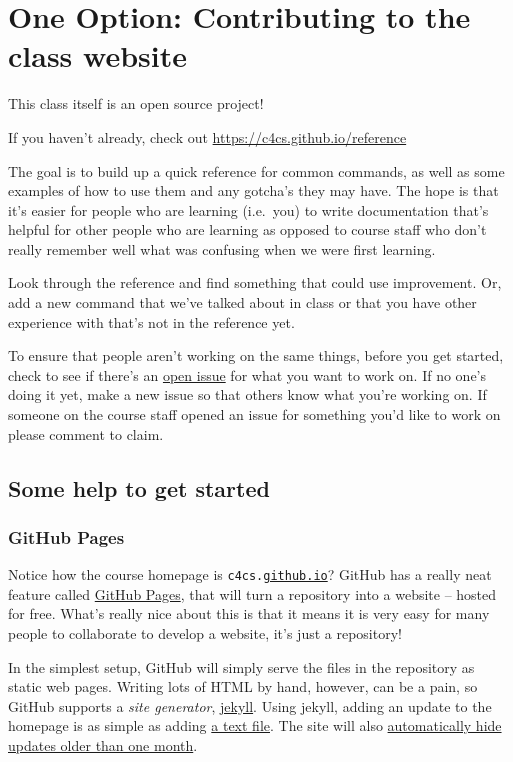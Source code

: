 \documentclass{article}
\begin{document}
\newpage

\section*{One Option: Contributing to the class website}

This class itself is an open source project!

If you haven't already, check out \url{https://c4cs.github.io/reference}

The goal is to build up a quick reference for common commands, as well as some
examples of how to use them and any gotcha's they may have. The hope is that
it's easier for people who are learning (i.e.\ you) to write documentation
that's helpful for other people who are learning as opposed to course staff
who don't really remember well what was confusing when we were first learning.

Look through the reference and find something that could use improvement. Or,
add a new command that we've talked about in class or that you have other
experience with that's not in the reference yet.

To ensure that people aren't working on the same things, before you get
started, check to see if there's an
\href{https://github.com/c4cs/c4cs.github.io/issues}{open issue} for what you
want to work on. If no one's doing it yet, make a new issue so that others
know what you're working on. If someone on the course staff opened an issue for
something you'd like to work on please comment to claim.

\subsection*{Some help to get started}

\subsubsection*{GitHub Pages}

Notice how the course homepage is \texttt{c4cs.\ul{github.io}}? GitHub has a
really neat feature called \href{https://pages.github.com/}{GitHub Pages},
that will turn a repository into a website -- hosted for free.
What's really nice about this is that it means it is very easy for many
people to collaborate to develop a website, it's just a repository!

In the simplest setup, GitHub will simply serve the files in the repository as
static web pages. Writing lots of HTML by hand, however, can be a pain, so
GitHub supports a \emph{site generator}, \href{https://jekyllrb.com/}{jekyll}.
Using jekyll, adding an update to the homepage is as simple as adding
\href{https://github.com/c4cs/c4cs.github.io/blob/master/_updates/f16/2016-10-11-chaos.md}{a text file}.
The site will also
\href{https://github.com/c4cs/c4cs.github.io/blob/master/index.html#L32}%
{automatically hide updates older than one month}.
\end{document}
